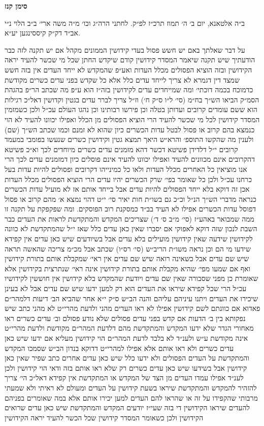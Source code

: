 \documentclass[12pt, openany]{book}
\newcommand{\chapname}{}
\newcommand{\newchap}[1]{
	\addcontentsline{toc}{chapter}{#1}
	\renewcommand{\chapname}{#1}
		\begin{center}
			\textbf{%
\fontsize{16pt}{16pt}\selectfont
				#1}
		\end{center}
}
\begin{document}
\newchap{סימן קנז}
\begin{multicols}{2}
ב״ה אלטאנא, יום ב׳ ה׳ תמוז תרכ״ז לפ״ק. לחתני הרה״ג וכו׳ מ״ה משה ארי׳ ב״ב הלוי נ״י אב״ד דק״ק קיססינגען יע״א.\\\vspace{0pt}

על דבר שאלתך באם יש חשש פסול בעדי קידושין הממונים מקהל אם יש תקנה לזה כבר הודעתיך שיש תקנה שיאמר המסדר קידושין קודם שיקדש החתן שכל מי שכשר להעיד יראה הקידושין ובזה הוציא הפסולים מכלל העדות ואע״פ שהמקדש לא ייחד העדים אין בזה חשש שמצד דין דגמרא לא צריך לייחד עדים כלל אלא כל שקדש בפני עדים כשרים מקודשת כדמוכח בכמה דוכתי׳ ומה שמייחדים עדים לקידושין בזה״ז הוא ע״פ מה שכתב הר״פ בהגהת הסמ״ק הביאו הש״ך בח״מ (סי׳ ל״ו ס״ק ח׳) וז״ל צריך לברר עדים בגטין וקדושין דאל״כ רגילות הוא ששם עומדים קרובים ועדותן בטלה וכן פירשו רבותינו וכן נהגו העולם עכ״ל ולכן כשמזמין המסדר קידושין לכל מי שכשר להעיד הרי הוציא הפסולים מן הכלל ואפילו יכוונו להעיד לא הוי כנמצא בהם קרוב או פסול לבטל עדות הכשרים כיון שהוא לא זמנם וכמו שכתב הש״ך (שם) ולענין מה שהקשו התוספ׳ והרא״ש היאך תמצא גטין וקידושין כשרים שנעשו בפומבי במעמד קרובים י״ל דלדידן פשיטא דכשר דהא מזמנים עדים כשרים מיוחדים לכך וא״כ פשיטא דהקרובים אינם מכוונים להעיד ואפילו יכוונו להעיד אינם פוסלים כיון דמזמנים עדים לכך הרי אנו מוציאין כל האחרים מכלל העדות ולאו כל כמינייהו דקרובים ופסולים להיות עדות בעל כרחנו עכ״ל ולכן כל שאומר בפי׳ שרק הכשרים יהיו עדים הרי הוציא הפסולים מכלל העדות אכן זה דוקא בלא ייחד הפסולים להיות עדים אבל בייחד אותם אז לא מועיל עדות הכשרים כנראה מדברי הש״ך הנ״ל וכ״כ גם בשו״ת חות יאיר סי׳ י״ט דהוי נמצא א׳ מהם קרוב או פסול דפוסל עדות הכשרים אפילו לא העיד בב״ד כמסקנת רוב הפוסקים. ומה שפקפקת על תקנה זו ממה שמבואר באהע״ז (סי׳ מ״ב ס׳ ד׳) שצריכים המקדש והמתקדשת לראות את העדים כבר השבת לנכון שזה דוקא לאפוקי אם יסברו שאין כאן עדים כלל שאז י״ל שהמתקדשת לא כוונה לקידושין שידעה שאין קידושין מועילים בלא עדים אבל בשיודעים שיש כאן עדים אין קפידא שידעו מי הם וכן נראה משו״ת הריב״ש (סי׳ רס״ו) שכתב אבל מכ״מ צריכה שהאשה תראה שיש שם עדים אבל כשאינה רואה שיש שם עדים אין ראי׳ שמקבלת אותם בתורת קידושין ואף אם שמעו מפי׳ שהיא מקבלת אותם בתורת קידושין אינה ראי׳ שנתרצית בקידושין אלא שאומרת כן מפני שסבורה שאין שם עדים ויודעת שהמקדש בלא קידושין אין חוששין לקידושיו עכ״ל הרי שכל קפידא שיראו את העדים הוא רק למען ידעו שיש שם עדים אבל לא בעינן שיכירו את העדים ויתנו עיניהם עליהם והנה הב״ש ס״ק י״א אחר שהביא הב׳ דיעות דלמהר״ם פאדוא אם כוונתם לשם קידושין אפילו לא ראו העדים מהני ולדעת מהרי״ט לא מהני כתב שיש נפקותא בין ב׳ הדעות אם קדש בפני עדים פסולים שלא נודע פסולם וב׳ עדים כשרים ראו מאחורי הגדר שלא ידעו המקדש והמתקדשת מהם דלדעת המהר״ם מקודשת ולדעת מהרי״ט אינה מקודשת ע״ש ולענ״ד לא בלבד לדעת המהר״ם הוי קידושין מעליא אם ידעו שיש כאן עדים כשרים ולא ראו אותם אלא אפילו למהרי״ט דדוקא בנדון הב״ש שסמכו המקדש והמתקדשת על העדים הפסולים ולא ידעו כלל שיש כאן עדים אחרים כתב שפיר שאין כאן קידושין אבל בשידעו שיש כאן עדים כשרים רק שלא ראו אותם בזה ודאי הוי קידושין ולכן לענ״ד אפילו עמדו העדים מן הצד של המקדש או המתקדשת אין קפידא דאל״כ הי׳ צריך להזהיר להמקדש והמתקדשת שיראו בשעת קידושין על העדים ומעולם לא ראיתי ולא שמעתי מרבותי שהקפידו על זה או שהראו להם העדים למען יכירו אותם אלא במה שאומרים בפניהם להעדים שיראו הקידושין די בזה שעי״ז יודעים המקדש והמתקדשת שיש כאן עדים שרואים הקידושין ולכן כשאומר המסדר קידושין שכל הכשר להעיד יראה הקידושין 
\end{multicols}
\end{document}
